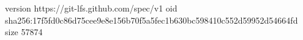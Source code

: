 version https://git-lfs.github.com/spec/v1
oid sha256:17f5fd0c86d75cee9e8e156b70f5a5fec1b630bc598410c552d59952d54664fd
size 57874
